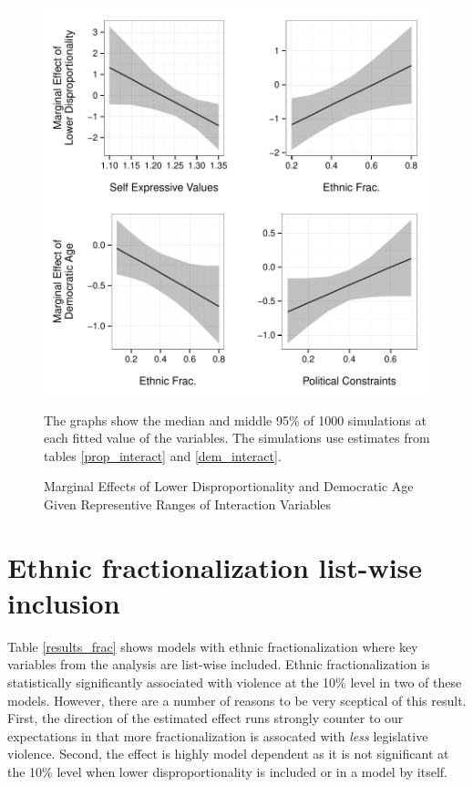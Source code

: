 \documentclass[a4paper]{article}\usepackage[]{graphicx}\usepackage[]{color}
\newenvironment{knitrout}{}{} %
\begin{document}
\begin{figure}
    \begin{center}
\begin{knitrout}
\color{fgcolor}
\includegraphics[width=0.95\linewidth]{figure/marginalEffects-1} 

\end{knitrout}
    \end{center}
    \caption{Marginal Effects of Lower Disproportionality and Democratic Age Given Representive Ranges of Interaction Variables}
    \label{marginal_effect_plot}
    \begin{singlespace}
      {\scriptsize{The graphs show the median and middle 95\% of 1000 simulations at each fitted value of the variables. The simulations use estimates from tables \ref{prop_interact} and \ref{dem_interact}.}}
    \end{singlespace}
\end{figure}


\section*{Ethnic fractionalization list-wise inclusion}


Table \ref{results_frac} shows models with ethnic fractionalization where key variables from the analysis are list-wise included. Ethnic fractionalization is statistically significantly associated with violence at the 10\% level in two of these models. However, there are a number of reasons to be very sceptical of this result. First, the direction of the estimated effect runs strongly counter to our expectations in that more fractionalization is assocated with \emph{less} legislative violence. Second, the effect is highly model dependent as it is not significant at the 10\% level when lower disproportionality is included or in a model by itself.
\end{document}

